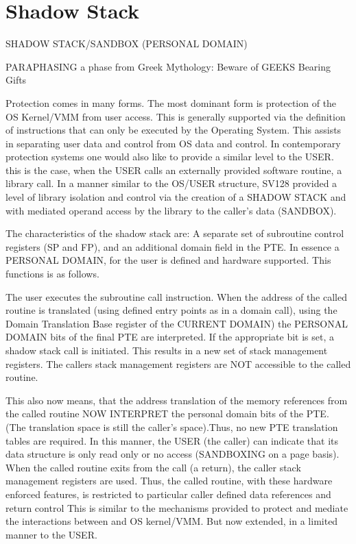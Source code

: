 \documentclass{article}
\begin{document}
\section{Shadow Stack}
SHADOW  STACK/SANDBOX (PERSONAL DOMAIN)

PARAPHASING  a phase from Greek Mythology: Beware of GEEKS Bearing Gifts

Protection comes in many forms.  The most dominant form is protection of  the OS Kernel/VMM from user access. This is generally supported via the definition of instructions that  can only be executed by the Operating System.  This assists in separating user data and control from OS  data and control.  In contemporary protection systems one would also like to provide a similar level to the USER.  this is the case, when the USER calls an externally provided software routine,  a library call. In a manner similar to the OS/USER structure, SV128 provided a level of library isolation and control via the creation of a SHADOW STACK  and with mediated operand access by the library to the caller's data (SANDBOX).

The characteristics of the shadow stack are:  A separate set of subroutine control registers (SP and FP),  and an additional domain field in the PTE.  In essence a PERSONAL DOMAIN, for the user is defined and hardware supported.  This functions is as follows.

The user executes the subroutine call instruction.  When the address of the called routine is translated (using defined entry points as in a domain call), using the Domain Translation Base register of the CURRENT DOMAIN)  the PERSONAL DOMAIN bits of the final PTE are interpreted. If the appropriate bit is set,     a shadow stack call is initiated. This results in a new set of stack management registers.  The callers stack management registers are NOT  accessible to the called routine.

This also now means,  that the  address translation of the memory references from the called routine  NOW INTERPRET  the personal domain bits of the PTE.  (The translation space is still the caller’s space).Thus, no new PTE translation tables are required.   In this manner, the USER (the caller) can indicate that its data structure is only read only or no access (SANDBOXING on a page basis).  When the called routine exits from the call (a return),  the caller stack management registers are used.  Thus, the called routine, with these hardware enforced features,   is restricted to particular caller defined data references and return control This is similar to the mechanisms provided to protect and mediate the interactions between and OS kernel/VMM.  But now extended,  in a limited manner to the USER.
\end{document}
